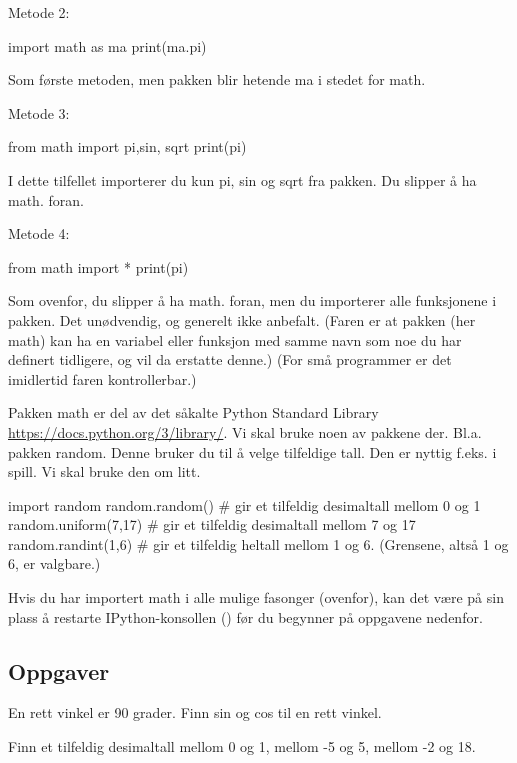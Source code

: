 {Metode 2:
\begin{usncodebox}
import math as ma
print(ma.pi)
\end{usncodebox}
Som første metoden, men pakken blir hetende ma i stedet for math.

Metode 3:
\begin{usncodebox}
from math import pi,sin, sqrt
print(pi)
\end{usncodebox}
I dette tilfellet importerer du kun pi, sin og sqrt fra pakken.
Du slipper å ha math. foran. 

Metode 4:
\begin{usncodebox}
from math import *
print(pi)
\end{usncodebox}

Som ovenfor, du slipper å ha math. foran, men du importerer alle funksjonene i pakken. Det unødvendig, og generelt ikke anbefalt. (Faren er at pakken (her math) kan ha en variabel eller funksjon med samme navn som noe du har definert tidligere, og vil da erstatte denne.) (For små programmer er det imidlertid faren kontrollerbar.) 

Pakken math er del av det såkalte Python Standard Library \url{https://docs.python.org/3/library/}. Vi skal bruke noen av pakkene der. Bl.a. pakken random. Denne bruker du til å velge tilfeldige tall. Den er nyttig f.eks. i spill. Vi skal bruke den om litt. 

\begin{usncodebox}
import random
random.random()          # gir et tilfeldig desimaltall mellom 0 og 1
random.uniform(7,17)     # gir et tilfeldig desimaltall mellom 7 og 17
random.randint(1,6)      # gir et tilfeldig heltall mellom 1 og 6. (Grensene, altså 1 og 6, er valgbare.)
\end{usncodebox}

Hvis du har importert math i alle mulige fasonger (ovenfor), kan det være på sin plass å restarte IPython-konsollen () før du begynner på oppgavene nedenfor. 

\subsection{Oppgaver}

\begin{question}
En rett vinkel er 90 grader. Finn sin og cos til en rett vinkel.
\end{question}

\begin{question}
Finn et tilfeldig desimaltall mellom 0 og 1, mellom -5 og 5, mellom -2 og 18.
\end{question}

}
